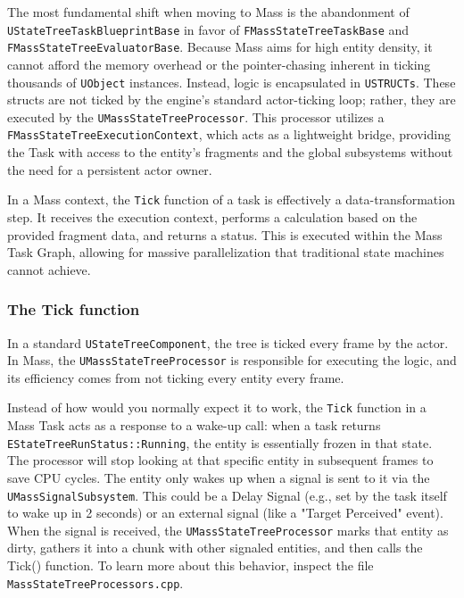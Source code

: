 The most fundamental shift when moving to Mass is the abandonment of \texttt{UStateTreeTaskBlueprintBase} in favor of \texttt{FMassStateTreeTaskBase} and \newline\texttt{FMassStateTreeEvaluatorBase}. Because Mass aims for high entity density, it cannot afford the memory overhead or the pointer-chasing inherent in ticking thousands of \texttt{UObject} instances. Instead, logic is encapsulated in \texttt{USTRUCTs}. These structs are not ticked by the engine's standard actor-ticking loop; rather, they are executed by the \texttt{UMassStateTreeProcessor}. This processor utilizes a \texttt{FMassStateTreeExecutionContext}, which acts as a lightweight bridge, providing the Task with access to the entity's fragments and the global subsystems without the need for a persistent actor owner.

In a Mass context, the \texttt{Tick} function of a task is effectively a data-transformation step. It receives the execution context, performs a calculation based on the provided fragment data, and returns a status. This is executed within the Mass Task Graph, allowing for massive parallelization that traditional state machines cannot achieve.

\subsubsection{The Tick function}

In a standard \texttt{UStateTreeComponent}, the tree is ticked every frame by the actor. In Mass, the \texttt{UMassStateTreeProcessor} is responsible for executing the logic, and its efficiency comes from not ticking every entity every frame.

Instead of how would you normally expect it to work, the \texttt{Tick} function in a Mass Task acts as a response to a wake-up call: when a task returns \texttt{EStateTreeRunStatus::Running}, the entity is essentially frozen in that state. The processor will stop looking at that specific entity in subsequent frames to save CPU cycles. The entity only wakes up when a signal is sent to it via the \texttt{UMassSignalSubsystem}. This could be a Delay Signal (e.g., set by the task itself to wake up in 2 seconds) or an external signal (like a "Target Perceived" event).
When the signal is received, the \texttt{UMassStateTreeProcessor} marks that entity as dirty, gathers it into a chunk with other signaled entities, and then calls the Tick() function. To learn more about this behavior, inspect the file \texttt{MassStateTreeProcessors.cpp}.

